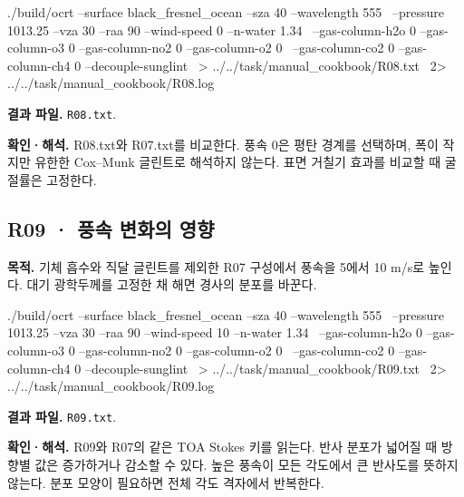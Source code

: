 \noindent\begin{minipage}{\linewidth}
\begin{ManualCode}

./build/ocrt --surface black_fresnel_ocean --sza 40 --wavelength 555 \
  --pressure 1013.25 --vza 30 --raa 90 --wind-speed 0 --n-water 1.34 \
  --gas-column-h2o 0 --gas-column-o3 0 --gas-column-no2 0 --gas-column-o2 0 \
  --gas-column-co2 0 --gas-column-ch4 0 --decouple-sunglint \
  > ../../task/manual_cookbook/R08.txt \
  2> ../../task/manual_cookbook/R08.log

\end{ManualCode}
\end{minipage}\par

\textbf{결과 파일. }\texttt{R08.txt}.

\textbf{확인·해석. }R08.txt와 R07.txt를 비교한다. 풍속 0은 평탄 경계를 선택하며, 폭이 작지만 유한한 Cox–Munk 글린트로 해석하지 않는다. 표면 거칠기 효과를 비교할 때 굴절률은 고정한다.


\subsection{R09 · 풍속 변화의 영향}
\label{sec:auto:09_cookbook:3.3}

\label{recipe:R09}

\textbf{목적. }기체 흡수와 직달 글린트를 제외한 R07 구성에서 풍속을 5에서 10 m/s로 높인다. 대기 광학두께를 고정한 채 해면 경사의 분포를 바꾼다.

\noindent\begin{minipage}{\linewidth}
\begin{ManualCode}

./build/ocrt --surface black_fresnel_ocean --sza 40 --wavelength 555 \
  --pressure 1013.25 --vza 30 --raa 90 --wind-speed 10 --n-water 1.34 \
  --gas-column-h2o 0 --gas-column-o3 0 --gas-column-no2 0 --gas-column-o2 0 \
  --gas-column-co2 0 --gas-column-ch4 0 --decouple-sunglint \
  > ../../task/manual_cookbook/R09.txt \
  2> ../../task/manual_cookbook/R09.log

\end{ManualCode}
\end{minipage}\par

\textbf{결과 파일. }\texttt{R09.txt}.

\textbf{확인·해석. }R09와 R07의 같은 TOA Stokes 키를 읽는다. 반사 분포가 넓어질 때 방향별 값은 증가하거나 감소할 수 있다. 높은 풍속이 모든 각도에서 큰 반사도를 뜻하지 않는다. 분포 모양이 필요하면 전체 각도 격자에서 반복한다.

